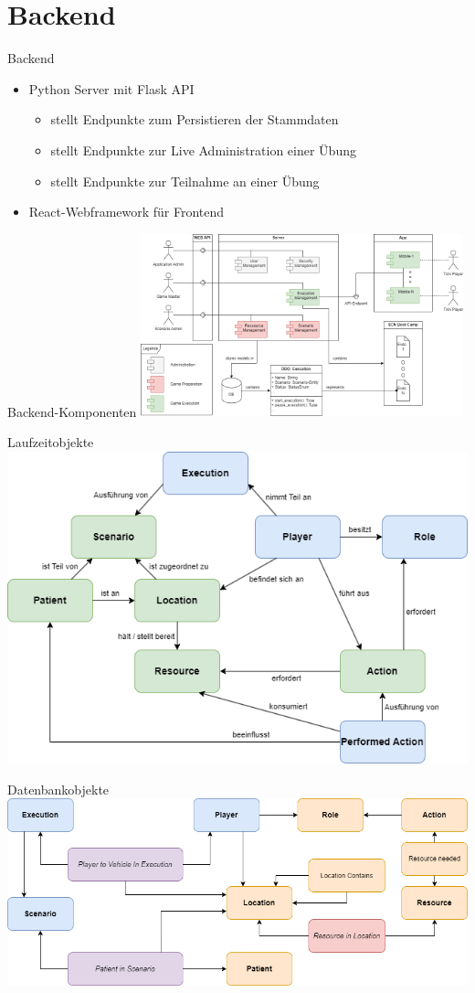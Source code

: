 \section{Backend}


\begin{frame}{Backend}
	\begin{itemize}
		\item Python Server mit Flask API
		\begin{itemize}
			\item stellt Endpunkte zum Persistieren der Stammdaten
			\item stellt Endpunkte zur Live Administration einer Übung
			\item stellt Endpunkte zur Teilnahme an einer Übung
		\end{itemize}
		\item React-Webframework für Frontend
	\end{itemize}
\end{frame}


\begin{frame}{Backend-Komponenten}
	\centering
	\includegraphics[width=0.7\textwidth]{images/server/component_diagram.png}
\end{frame}


\begin{frame}{Laufzeitobjekte}
	\centering
	\includegraphics[height=.86\textheight]{images/server_laufzeit_objekte.png}
\end{frame}


\begin{frame}{Datenbankobjekte}
	\centering
	\includegraphics[width=\textwidth]{images/server_datenbank_objekte.png}
\end{frame}
